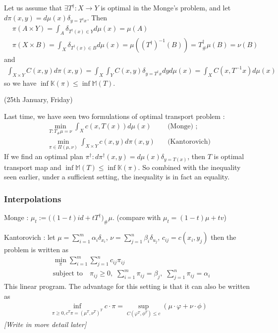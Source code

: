 \documentclass[12pt,a4paper]{article}
\begin{document}
\quad Let us assume that $\exists T^{\dagger} : X\rightarrow Y$ is optimal in the Monge's problem, and let $d\pi(x,y) = d\mu(x) \delta_{y = T^{\dagger} x}$. Then
\begin{align*}
& \pi(A \times Y) = \int_A \delta_{T^{\dagger}(x) \in Y} d\mu(x) = \mu(A) \\
& \pi(X\times B) = \int_X \delta_{T^{\dagger}(x)\in B} d\mu(x) = \mu((T^{\dagger})^{-1}(B)) = T_{\#}^{\dagger} \mu(B) = \nu(B)
\end{align*}
and
\begin{align*}
\int_{X\times Y}C(x,y) d\pi(x,y) = \int_X \int_Y C(x,y) \delta_{y = T^{\dagger}x} dy d\mu(x) = \int_X C(x,T^{-1}x) d\mu(x)  
\end{align*}
so we have $\inf \mathbb{K}(\pi) \leq \inf \mathbb{M}(T)$.
\s

\newday

(25th January, Friday)
\s

Last time, we have seen two formulations of optimal transport problem :
\begin{align*}
\min_{T : T_{\#}\mu =\nu} \int_X c(x, T(x))d\mu(x) &\quad \text{(Monge)}\,\, ; \\
\min_{\pi \in \Pi(\mu, \nu)} \int_{X\times Y} c(x,y) d\pi(x,y) &\quad \text{(Kantorovich)}
\end{align*}
If we find an optimal plan $\pi^{\dagger} : d\pi^{\dagger}(x,y) = d\mu(x) \delta_{y= T(x)}$, then $T$ is optimal transport map and $\inf \mathbb{M}(T) \leq \inf \mathbb{K}(\pi)$. So combined with the inequality seen earlier, under a sufficient setting, the inequality is in fact an equality.
\s

\subsubsection*{Interpolations}

Monge : $\mu_t := \Big( (1-t)id + tT^{\dagger} \Big)_{\#} \mu$. (compare with $\mu_t = (1-t)\mu + tv$)

Kantorovich : let $\mu =\sum_{i=1}^m \alpha_i \delta_{x_i}$, $\nu =\sum_{j=1}^n \beta_i \delta_{u_j}$, $c_{ij} = c(x_i, y_j)$ then the problem is written as
\begin{align*}
& \min_{\pi} \sum_{i=1}^m \sum_{j=1}^n c_{ij} \pi_{ij} \\
& \text{subject to} \quad \pi_{ij} \geq 0, \,\,\sum_{i=1}^m \pi_{ij} =\beta_j,\,\, \sum_{j=1}^n \pi_{ij} = \alpha_i
\end{align*}
This linear program. The advantage for this setting is that it can also be written as
\begin{align*}
\inf_{\pi \geq 0, c^T \pi = (\mu^T, \nu^T)^T} c\cdot\pi = \sup_{C(\varphi^T, \phi^T)\leq c}(\mu \cdot \varphi + \nu \cdot \phi)
\end{align*}
\emph{[Write in more detail later]}
\end{document}
